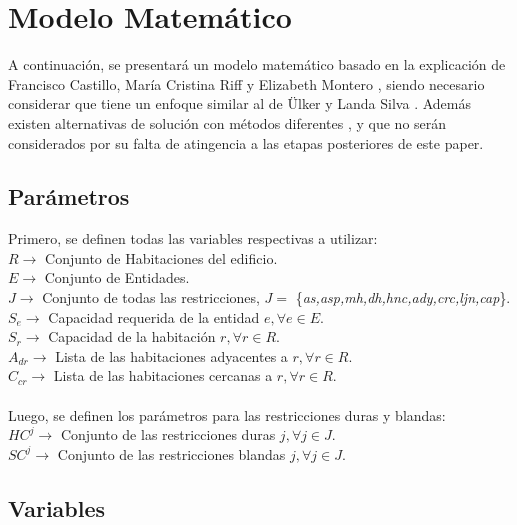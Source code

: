 \documentclass[letter, 10pt]{article}
\begin{document}
\section{Modelo Matem\'atico}

A continuaci\'on, se presentar\'a un modelo matem\'atico basado en la explicaci\'on de Francisco Castillo, Mar\'ia Cristina Riff y Elizabeth Montero \cite{USM}, siendo necesario considerar que tiene un enfoque similar al de \"Ulker y Landa Silva \cite{ulker20100}. Adem\'as existen alternativas de soluci\'on con m\'etodos diferentes \cite{awadallah2012office}, \cite{bolaji2019adaptation} y \cite{lopes2010office} que no ser\'an considerados por su falta de atingencia a las etapas posteriores de este paper.

\subsection{Par\'ametros}

Primero, se definen todas las variables respectivas a utilizar: \\

\noindent
$R \rightarrow $ Conjunto de Habitaciones del edificio. \\
$E \rightarrow $ Conjunto de Entidades. \\
$J \rightarrow $ Conjunto de todas las restricciones, $J =$ \{\textit{as,asp,mh,dh,hnc,ady,crc,ljn,cap}\}. \\ 
$S_{e} \rightarrow $ Capacidad requerida de la entidad $e, \forall e \in E$. \\
$S_{r} \rightarrow $ Capacidad de la habitaci\'on $r, \forall r \in R$. \\
$A_{dr} \rightarrow $ Lista de las habitaciones adyacentes a $r, \forall r \in R$. \\
$C_{cr} \rightarrow $ Lista de las habitaciones cercanas a $r, \forall r \in R$. \\
\noindent \\
Luego, se definen los par\'ametros para las restricciones duras y blandas: \\

\noindent
$HC^j \rightarrow $ Conjunto de las restricciones duras $j, \forall j \in J$. \\
$SC^j \rightarrow $ Conjunto de las restricciones blandas $j, \forall j \in J$. 

\subsection{Variables}
\end{document}

